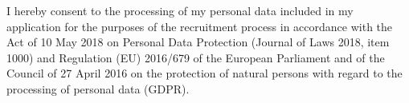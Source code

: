 \documentclass[a4paper, 10pt]{article}
\begin{document}
\vfill
\noindent\small I hereby consent to the processing of my personal data included in my application for the purposes of the recruitment process in accordance with the Act of 10 May 2018 on Personal Data Protection (Journal of Laws 2018, item 1000) and Regulation (EU) 2016/679 of the European Parliament and of the Council of 27 April 2016 on the protection of natural persons with regard to the processing of personal data (GDPR).
\end{document}
